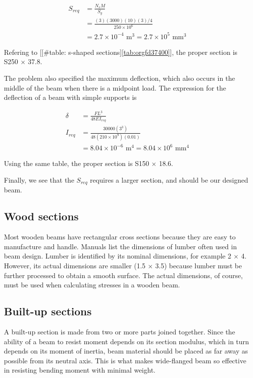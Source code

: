 \documentclass[a4paper,openany,12pt]{book}
\begin{document}
{{$$\begin{aligned}
    S_{req} &= \frac{N_s M}{S_y} \\
            &= \frac{(3)(3000)(10)(3)/4}{250 \times 10^6} \\
            &= 2.7 \times 10^{-4} \text{ m}^3 = 2.7 \times 10^5 \text{ mm}^3
  \end{aligned}$$

Refering to [[\#table: s-shaped sections]\ref{tab:orgfd37400}],
the proper section is S250 \(\times\) 37.8.

The problem also specified the maximum deflection, which also occurs in
the middle of the beam when there is a midpoint load. The expression for
the deflection of a beam with simple supports is

$$\begin{aligned}
    \delta &= \frac{FL^3}{48EI_{req}} \\
    I_{req} &= \frac{30000(3^3)}{48(210 \times 10^9)(0.01)} \\
           &= 8.04 \times 10^{-6} \text{ m}^4 = 8.04 \times 10^6 \text{ mm}^4
  \end{aligned}$$

Using the same table, the proper section is S150 \(\times\) 18.6.

Finally, we see that the \(S_{req}\) requires a larger section, and should
be our designed beam.

\subsection{Wood sections}
\label{sec:orgad64d73}
Most wooden beams have rectangular cross sections because they are easy
to manufacture and handle. Manuals list the dimensions of lumber often
used in beam design. Lumber is identified by its nominal dimensions, for
example 2 \(\times\) 4. However, its actual dimensions are smaller (1.5
\(\times\) 3.5) because lumber must be further processed to obtain a
smooth surface. The actual dimensions, of course, must be used when
calculating stresses in a wooden beam.

\subsection{Built-up sections}
\label{sec:orgf8cf5eb}
A built-up section is made from two or more parts joined together. Since
the ability of a beam to resist moment depends on its section modulus,
which in turn depends on its moment of inertia, beam material should be
placed as far away as possible from its neutral axis. This is what makes
wide-flanged beam so effective in resisting bending moment with minimal
weight.

}}
\end{document}
